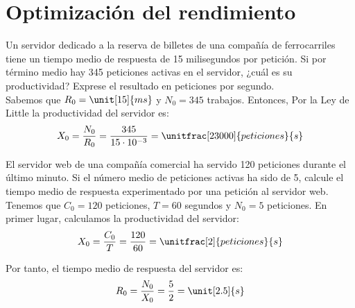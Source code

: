 \section{Optimización del rendimiento}

\begin{ejercicio}\label{ej:5.1}
    Un servidor dedicado a la reserva de billetes de una compañía de ferrocarriles tiene un tiempo medio de respuesta de 15 milisegundos por petición. Si por término medio hay 345 peticiones activas en el servidor, ¿cuál es su productividad? Exprese el resultado en peticiones por segundo.\\

    Sabemos que $R_0=\unit[15]{ms}$ y $N_0=345$ trabajos. Entonces, Por la Ley de Little la productividad del servidor es:
    \begin{equation*}
        X_0 = \dfrac{N_0}{R_0} = \dfrac{345}{15\cdot10^{-3}} = \unitfrac[23000]{peticiones}{s}
    \end{equation*}
        
\end{ejercicio}
\begin{comment}
\solucion
    La productividad del servidor es de 23000 peticiones por segundo.
\end{comment}

\begin{ejercicio}\label{ej:5.2}
    El servidor web de una compañía comercial ha servido 120 peticiones durante el último minuto. Si el número medio de peticiones activas ha sido de 5, calcule el tiempo medio de respuesta experimentado por una petición al servidor web.\\

    Tenemos que $C_0 = 120$ peticiones, $T = 60$ segundos y $N_0 = 5$ peticiones. En primer lugar, calculamos la productividad del servidor:
    \begin{equation*}
        X_0 = \dfrac{C_0}{T} = \dfrac{120}{60} = \unitfrac[2]{peticiones}{s}
    \end{equation*}

    Por tanto, el tiempo medio de respuesta del servidor es:
    \begin{equation*}
        R_0 = \dfrac{N_0}{X_0} = \dfrac{5}{2} = \unit[2.5]{s}
    \end{equation*}
\end{ejercicio}
\begin{comment}
\solucion
    El tiempo medio de respuesta es de 2,5 segundos.
\end{comment}

